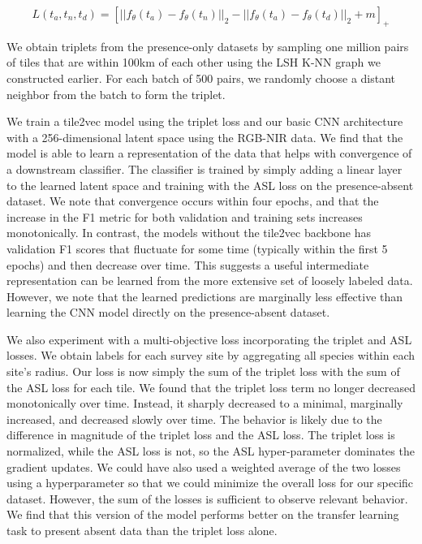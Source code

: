 \begin{equation}
    L(t_a, t_n, t_d) = \left[
        ||f_{\theta}(t_a) - f_{\theta}(t_n)||_2
        - ||f_{\theta}(t_a) - f_{\theta}(t_d)||_2
        +m
    \right]_+
\end{equation}

We obtain triplets from the presence-only datasets by sampling one million pairs of tiles that are within 100km of each other using the LSH K-NN graph we constructed earlier.
For each batch of 500 pairs, we randomly choose a distant neighbor from the batch to form the triplet.

We train a tile2vec model using the triplet loss and our basic CNN architecture with a 256-dimensional latent space using the RGB-NIR data.
We find that the model is able to learn a representation of the data that helps with convergence of a downstream classifier.
The classifier is trained by simply adding a linear layer to the learned latent space and training with the ASL loss on the presence-absent dataset.
We note that convergence occurs within four epochs, and that the increase in the F1 metric for both validation and training sets increases monotonically.
In contrast, the models without the tile2vec backbone has validation F1 scores that fluctuate for some time (typically within the first 5 epochs) and then decrease over time.
This suggests a useful intermediate representation can be learned from the more extensive set of loosely labeled data.
However, we note that the learned predictions are marginally less effective than learning the CNN model directly on the presence-absent dataset.

We also experiment with a multi-objective loss incorporating the triplet and ASL losses.
We obtain labels for each survey site by aggregating all species within each site's radius.
Our loss is now simply the sum of the triplet loss with the sum of the ASL loss for each tile.
We found that the triplet loss term no longer decreased monotonically over time.
Instead, it sharply decreased to a minimal, marginally increased, and decreased slowly over time.
The behavior is likely due to the difference in magnitude of the triplet loss and the ASL loss.
The triplet loss is normalized, while the ASL loss is not, so the ASL hyper-parameter dominates the gradient updates.
We could have also used a weighted average of the two losses using a hyperparameter so that we could minimize the overall loss for our specific dataset.
However, the sum of the losses is sufficient to observe relevant behavior.
We find that this version of the model performs better on the transfer learning task to present absent data than the triplet loss alone.